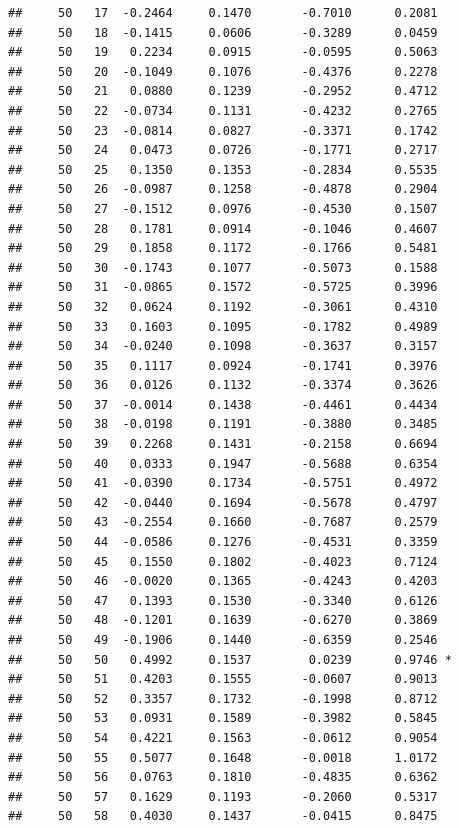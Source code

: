 \documentclass[
]{article}
\begin{document}
\begin{verbatim}
##     50   17  -0.2464     0.1470       -0.7010      0.2081  
##     50   18  -0.1415     0.0606       -0.3289      0.0459  
##     50   19   0.2234     0.0915       -0.0595      0.5063  
##     50   20  -0.1049     0.1076       -0.4376      0.2278  
##     50   21   0.0880     0.1239       -0.2952      0.4712  
##     50   22  -0.0734     0.1131       -0.4232      0.2765  
##     50   23  -0.0814     0.0827       -0.3371      0.1742  
##     50   24   0.0473     0.0726       -0.1771      0.2717  
##     50   25   0.1350     0.1353       -0.2834      0.5535  
##     50   26  -0.0987     0.1258       -0.4878      0.2904  
##     50   27  -0.1512     0.0976       -0.4530      0.1507  
##     50   28   0.1781     0.0914       -0.1046      0.4607  
##     50   29   0.1858     0.1172       -0.1766      0.5481  
##     50   30  -0.1743     0.1077       -0.5073      0.1588  
##     50   31  -0.0865     0.1572       -0.5725      0.3996  
##     50   32   0.0624     0.1192       -0.3061      0.4310  
##     50   33   0.1603     0.1095       -0.1782      0.4989  
##     50   34  -0.0240     0.1098       -0.3637      0.3157  
##     50   35   0.1117     0.0924       -0.1741      0.3976  
##     50   36   0.0126     0.1132       -0.3374      0.3626  
##     50   37  -0.0014     0.1438       -0.4461      0.4434  
##     50   38  -0.0198     0.1191       -0.3880      0.3485  
##     50   39   0.2268     0.1431       -0.2158      0.6694  
##     50   40   0.0333     0.1947       -0.5688      0.6354  
##     50   41  -0.0390     0.1734       -0.5751      0.4972  
##     50   42  -0.0440     0.1694       -0.5678      0.4797  
##     50   43  -0.2554     0.1660       -0.7687      0.2579  
##     50   44  -0.0586     0.1276       -0.4531      0.3359  
##     50   45   0.1550     0.1802       -0.4023      0.7124  
##     50   46  -0.0020     0.1365       -0.4243      0.4203  
##     50   47   0.1393     0.1530       -0.3340      0.6126  
##     50   48  -0.1201     0.1639       -0.6270      0.3869  
##     50   49  -0.1906     0.1440       -0.6359      0.2546  
##     50   50   0.4992     0.1537        0.0239      0.9746 *
##     50   51   0.4203     0.1555       -0.0607      0.9013  
##     50   52   0.3357     0.1732       -0.1998      0.8712  
##     50   53   0.0931     0.1589       -0.3982      0.5845  
##     50   54   0.4221     0.1563       -0.0612      0.9054  
##     50   55   0.5077     0.1648       -0.0018      1.0172  
##     50   56   0.0763     0.1810       -0.4835      0.6362  
##     50   57   0.1629     0.1193       -0.2060      0.5317  
##     50   58   0.4030     0.1437       -0.0415      0.8475  

\end{verbatim}
\end{document}
